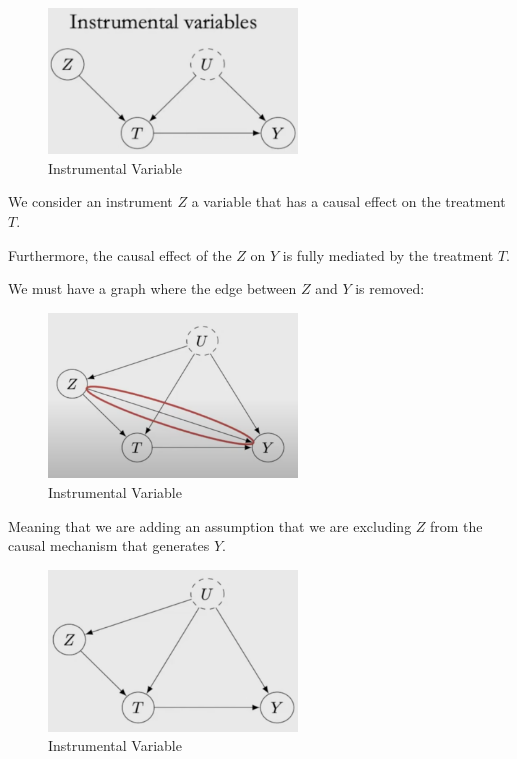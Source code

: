 \documentclass{article}
\begin{document}
\begin{figure}[H]
  \centering
  \includegraphics[width=250px]{draft-photos/instrumental_variable_explanation.png}
  \caption{Instrumental Variable}
  \label{fig:instrumental_variable_explanation}
\end{figure}

We consider an instrument $Z$ a variable that has a causal effect on the treatment $T$.

Furthermore, the causal effect of the $Z$ on $Y$ is fully mediated by the treatment $T$.

We must have a graph where the edge between $Z$ and $Y$ is removed:

\begin{figure}[H]
  \centering
  \includegraphics[width=250px]{draft-photos/instrumental_variable_explanation2.png}
  \caption{Instrumental Variable}
  \label{fig:instrumental_variable_explanation2}
\end{figure}

Meaning that we are adding an assumption that we are excluding $Z$ from the causal mechanism that generates $Y$.

\begin{figure}[H]
  \centering
  \includegraphics[width=250px]{draft-photos/instrumental_variable_explanation3.png}
  \caption{Instrumental Variable}
  \label{fig:instrumental_variable_explanation3}
\end{figure}
\end{document}
